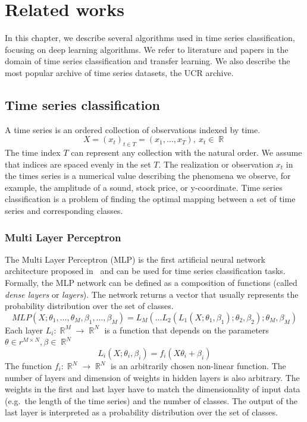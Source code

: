 \documentclass[a4paper,11pt,twoside]{report}
\theoremstyle{definition}
\DeclareMathOperator{\real}{\mathbb{R}}
\begin{document}
\chapter{Related works}
In this chapter, we describe several algorithms used in time series classification, focusing on deep learning algorithms. We refer to literature and papers in the domain of time series classification and transfer learning. We also describe the most popular archive of time series datasets, the UCR archive.


\section{Time series classification}
A time series is an ordered collection of observations indexed by time.
$$X = (x_t)_{t\in T} = (x_1, ... , x_T),\ x_t\in \real$$
The time index $T$ can represent any collection with the natural order. We assume that indices are spaced evenly in the set $T$. The realization or observation $x_t$ in the times series is a numerical value describing the phenomena we observe, for example, the amplitude of a sound, stock price, or y-coordinate. Time series classification is a problem of finding the optimal mapping between a set of time series and corresponding classes.



\subsection{Multi Layer Perceptron}\label{mlp_section_related}
The Multi Layer Perceptron (MLP) is the first artificial neural network architecture proposed in~\cite{dl_tsc} and can be used for time series classification tasks.
Formally, the MLP network can be defined as a composition of functions (called \textit{dense layers} or \textit{layers}). The network returns a vector that usually represents the probability distribution over the set of classes.
$$MLP(X; \theta_1,\dots , \theta_M, \beta_1,\dots , \beta_M) = L_M(\dots L_2(L_1(X;\theta_1, \beta_1);\theta_2, \beta_2);\theta_M, \beta_M)$$
Each layer $L_i: \real^M \rightarrow \real^N$ is a function that depends on the parameters $\theta \in r^{M\times N}, \beta \in \real^N$
$$L_i(X ; \theta_i, \beta_i) = f_i(X \theta_i  + \beta_i)$$
The function $f_i: \real^N \rightarrow \real^N$ is an arbitrarily chosen non-linear function. The number of layers and dimension of weights in hidden layers is also arbitrary. The weights in the first and last layer have to match the dimensionality of input data (e.g.~the length of the time series) and the number of classes. The output of the last layer is interpreted as a probability distribution over the set of classes.
\end{document}
